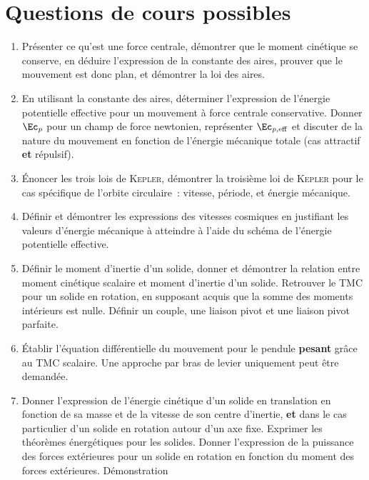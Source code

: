 \documentclass[a4paper, 12pt, final, garamond]{book}
\begin{document}
\section{Questions de cours possibles}
\begin{enumerate}[label=\sqenumi]
    \item Présenter ce qu'est une force centrale, démontrer que le moment
        cinétique se conserve, en déduire l'expression de la constante des
        aires, prouver que le mouvement est donc plan, et démontrer la loi des
        aires.
    \item En utilisant la constante des aires, déterminer l'expression de
        l'énergie potentielle effective pour un mouvement à force centrale
        conservative. Donner $\Ec_p$ pour un champ de force newtonien, 
        représenter $\Ec_{p,\rm eff}$ et discuter de la nature du mouvement en
        fonction de l'énergie mécanique totale (cas attractif \textbf{et}
        répulsif).
    \item Énoncer les trois lois de \textsc{Kepler}, démontrer la troisième loi
        de \textsc{Kepler} pour le cas spécifique de l'orbite circulaire~:
        vitesse, période, et énergie mécanique.
    \item Définir et démontrer les expressions des vitesses cosmiques en
        justifiant les valeurs d'énergie mécanique à atteindre à l'aide du
        schéma de l'énergie potentielle effective.
    \item Définir le moment d'inertie d'un solide, donner et démontrer la
        relation entre moment cinétique scalaire et moment d'inertie d'un
        solide. Retrouver le TMC pour un solide en rotation, en supposant acquis
        que la somme des moments intérieurs est nulle. Définir un couple, une
        liaison pivot et une liaison pivot parfaite.
    \item Établir l'équation différentielle du mouvement pour le pendule
        \textbf{pesant} grâce au TMC scalaire. Une approche par bras de levier
        uniquement peut être demandée.
    \item Donner l'expression de l'énergie cinétique d'un solide en translation
        en fonction de sa masse et de la vitesse de son centre d'inertie,
        \textbf{et} dans le cas particulier d'un solide en rotation autour d'un
        axe fixe. Exprimer les théorèmes énergétiques pour les solides. Donner
        l'expression de la puissance des forces extérieures pour un solide en
        rotation en fonction du moment des forces extérieures. Démonstration

\end{enumerate}
\end{document}
